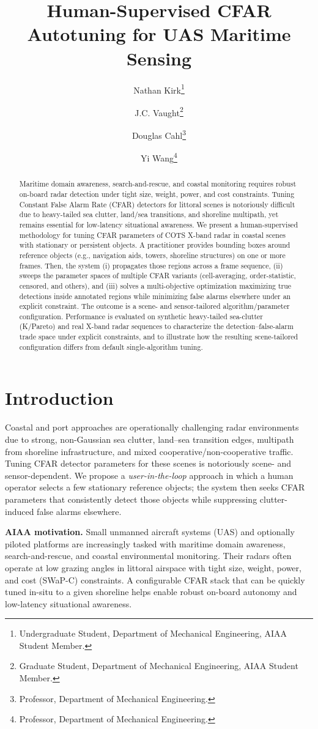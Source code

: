 \documentclass[conf]{new-aiaa}
\title{Human-Supervised CFAR Autotuning for UAS Maritime Sensing}
\author{Nathan Kirk\footnote{Undergraduate Student, Department of Mechanical Engineering, AIAA Student Member.}}
\author{J.C. Vaught\footnote{Graduate Student, Department of Mechanical Engineering, AIAA Student Member.}}
\author{Douglas Cahl\footnote{Professor, Department of Mechanical Engineering.}}
\author{Yi Wang\footnote{Professor, Department of Mechanical Engineering.}}
\affil{University of South Carolina, Columbia, SC, 29208}
\date{}
\begin{document}
\maketitle

\begin{abstract}
Maritime domain awareness, search-and-rescue, and coastal monitoring requires robust on-board radar detection under tight size, weight, power, and cost constraints. Tuning Constant False Alarm Rate (CFAR) detectors for littoral scenes is notoriously difficult due to heavy-tailed sea clutter, land/sea transitions, and shoreline multipath, yet remains essential for low-latency situational awareness. We present a human-supervised methodology for tuning CFAR parameters of COTS X-band radar in coastal scenes with stationary or persistent objects. A practitioner provides bounding boxes around reference objects (e.g., navigation aids, towers, shoreline structures) on one or more frames. Then, the system (i) propagates those regions across a frame sequence, (ii) sweeps the parameter spaces of multiple CFAR variants (cell-averaging, order-statistic, censored, and others), and (iii) solves a multi-objective optimization maximizing true detections inside annotated regions while minimizing false alarms elsewhere under an explicit  constraint. The outcome is a scene- and sensor-tailored algorithm/parameter configuration. Performance is evaluated on synthetic heavy-tailed sea-clutter (K/Pareto) and real X-band radar sequences to characterize the detection–false-alarm trade space under explicit  constraints, and to illustrate how the resulting scene-tailored configuration differs from default single-algorithm tuning.
\end{abstract}

\section{Introduction}
Coastal and port approaches are operationally challenging radar environments due to strong, non-Gaussian sea clutter, land--sea transition edges, multipath from shoreline infrastructure, and mixed cooperative/non-cooperative traffic. Tuning CFAR detector parameters for these scenes is notoriously scene- and sensor-dependent. We propose a \emph{user-in-the-loop} approach in which a human operator selects a few stationary reference objects; the system then seeks CFAR parameters that consistently detect those objects while suppressing clutter-induced false alarms elsewhere.

\textbf{AIAA motivation.} Small unmanned aircraft systems (UAS) and optionally piloted platforms are increasingly tasked with maritime domain awareness, search-and-rescue, and coastal environmental monitoring. Their radars often operate at low grazing angles in littoral airspace with tight size, weight, power, and cost (SWaP-C) constraints. A configurable CFAR stack that can be quickly tuned in-situ to a given shoreline helps enable robust on-board autonomy and low-latency situational awareness.
\end{document}
